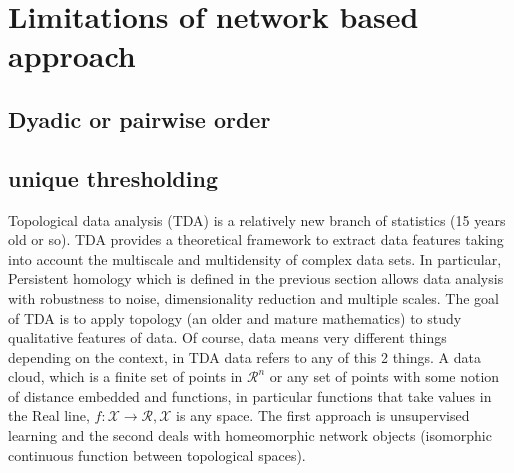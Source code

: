 \documentclass[onecollarge,runningheads]{svjour2}
\begin{document}
\section{Limitations of network based approach}
\label{se:tda}


\subsection{Dyadic or pairwise order}
\subsection{unique thresholding}

Topological data analysis (TDA) is a relatively new branch of statistics (15 years old or so). TDA provides a theoretical framework to extract data features taking into account the multiscale and multidensity of complex data sets. In particular, Persistent homology which is defined in the previous section allows data analysis with robustness to noise, dimensionality reduction and multiple scales. The goal of TDA is to apply topology (an older and mature mathematics) to study qualitative features of data. Of course, data means very different things depending on the context, in TDA data refers to any of this 2 things. A data cloud, which is  a finite set of points in $\mathcal{R}^n$  or any set of points with some notion of distance embedded and functions, in particular functions that take values in the Real line, $f:\mathcal{X} \to \mathcal{R}, \mathcal{X}$ is any space. The first approach is unsupervised learning and the second deals with homeomorphic network objects (isomorphic continuous function between topological spaces). 
\end{document}
